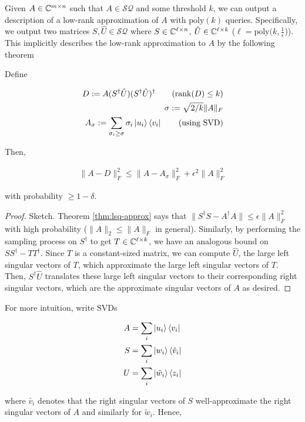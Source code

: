 \documentclass[main.tex]{subfiles}
\begin{document}
Given $A \in \mathbb{C}^{m\times n}$ such that $A \in \mathcal{SQ}$ and some threshold $k$, we can output a description of a low-rank approximation of $A$ with $\text{poly}(k)$ queries. Specifically, we output two matrices $S,\hat{U}\in \mathcal{SQ}$ where $S \in \mathbb{C}^{\ell \times n}$, $\hat{U} \in \mathbb{C}^{\ell \times k}$ ($\ell = \text{poly}(k,\frac{1}{\epsilon}$)). This implicitly describes the low-rank approximation to $A$ by the following theorem
\begin{theorem}
Define 

\begin{align*}
	D := A(S^\dagger\hat{U})(S^\dagger\hat{U})^\dag \tag{$\rank(D) \leq k$}\\
	\sigma := \sqrt{2/k} \| A\|_F  \\
	A_\sigma := \sum_{\sigma_i \geq \sigma} \sigma_i \ket{u_i}\bra{v_i} \tag{using SVD}
\end{align*}

Then,

\begin{align*}
	\| A - D \|^2_F  \leq \| A - A_\sigma \|^2_F  + \epsilon^2 \|A\|^2_F
\end{align*}

with probability $\geq 1- \delta$.
\end{theorem}

\begin{proof}
	Sketch. Theorem \ref{thm:lsq-approx} says that $\| S^\dag S - A^\dag A\| \leq \epsilon \|A\|^2_F$ with high probability ($\|A\|_2 \leq \|A\|_F$ in general). Similarly, by performing the sampling process on $S^\dag$ to get $T \in \mathbb{C}^{\ell \times k}$, we have an analogous bound on $SS^\dag - TT^\dag$. Since $T$ is a constant-sized matrix, we can compute $\hat{U}$, the large left singular vectors of $T$, which approximate the large left singular vectors of $T$. Then, $S^\dag \hat{U}$ translates these large left singular vectors to their corresponding right singular vectors, which are the approximate singular vectors of $A$ as desired.
\end{proof}

For more intuition, write SVDs

\begin{align*}
A &= \sum_i \ket{u_i} \bra{v_i} \\
S &= \sum_i \ket{w_i} \bra{\tilde{v}_i} \\
U &= \sum_i \ket{\tilde{w}_i}\bra{z_i}	
\end{align*}

where $\tilde{v_i}$ denotes that the right singular vectors of $S$ well-approximate the right singular vectors of $A$ and similarly for $\tilde{w}_i$. Hence,
\end{document}
